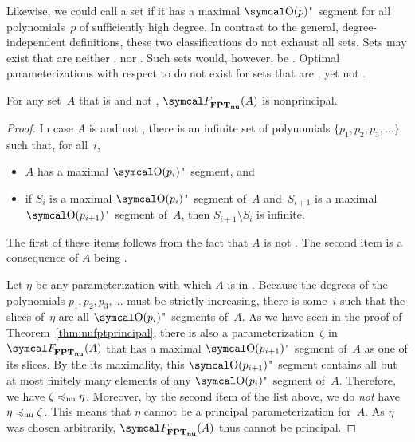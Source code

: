 Likewise, we could call a set  if it has a maximal $\bigO(p)$"~segment for all polynomials~$p$ of sufficiently high degree.
In contrast to the general, degree-independent definitions, these two classifications do not exhaust all sets.
Sets may exist that are neither , nor .
Such sets would, however, be .
Optimal parameterizations with respect to  do not exist for sets that are , yet not .
\begin{theorem}
\label{thm:nufptnonprincipal}%
  For any set~$A$ that is  and not , $\calF_\clnu{FPT}(A)$ is nonprincipal.
\end{theorem}
\begin{proof}
  In case $A$ is  and not , there is an infinite set of polynomials $\{p_1, p_2, p_3, \ldots\}$ such that, for all~$i$,
  \begin{itemize}
  \item $A$ has a maximal $\bigO(p_i)$"~segment, and
  \item if $S_i$ is a maximal $\bigO(p_i)$"~segment of~$A$ and~$S_{i + 1}$ is a maximal $\bigO(p_{i + 1})$"~segment of~$A$, then $S_{i + 1} \setminus S_i$ is infinite.
  \end{itemize}
  The first of these items follows from the fact that $A$ is not .
  The second item is a consequence of $A$ being .

  Let $\eta$ be any parameterization with which $A$ is in .
  Because the degrees of the polynomials $p_1, p_2, p_3, \ldots$ must be strictly increasing, there is some~$i$ such that the slices of~$\eta$ are all $\bigO(p_i)$"~segments of~$A$.
  As we have seen in the proof of Theorem~\ref{thm:nufptprincipal}, there is also a parameterization~$\zeta$ in $\calF_\clnu{FPT}(A)$ that has a maximal $\bigO(p_{i+1})$"~segment of~$A$ as one of its slices.
  By the its maximality, this $\bigO(p_{i+1})$"~segment contains all but at most finitely many elements of any $\bigO(p_i)$"~segment of~$A$.
  Therefore, we have $\zeta \preccurlyeq_\mathrm{nu} \eta$.
  Moreover, by the second item of the list above, we do \emph{not} have $\eta \preccurlyeq_\mathrm{nu} \zeta$.
  This means that $\eta$ cannot be a principal parameterization for~$A$.
  As $\eta$ was chosen arbitrarily, $\calF_\clnu{FPT}(A)$ thus cannot be principal.
\end{proof}

